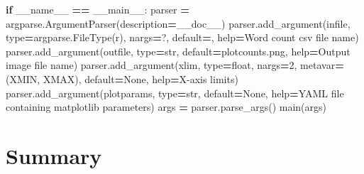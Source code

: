 \documentclass[
]{krantz}
\makeatletter
\newenvironment{Shaded}{\begin{snugshade}}{\end{snugshade}}
\newcommand{\BuiltInTok}[1]{#1}
\newcommand{\ControlFlowTok}[1]{\textcolor[rgb]{0.13,0.29,0.53}{\textbf{#1}}}
\newcommand{\DecValTok}[1]{\textcolor[rgb]{0.00,0.00,0.81}{#1}}
\newcommand{\NormalTok}[1]{#1}
\newcommand{\OperatorTok}[1]{\textcolor[rgb]{0.81,0.36,0.00}{\textbf{#1}}}
\newcommand{\StringTok}[1]{\textcolor[rgb]{0.31,0.60,0.02}{#1}}
\newcommand{\VariableTok}[1]{\textcolor[rgb]{0.00,0.00,0.00}{#1}}
\newenvironment{kframe}{%
\medskip{}
\setlength{\fboxsep}{.8em}
 \def\at@end@of@kframe{}%
 \ifinner\ifhmode%
  \def\at@end@of@kframe{\end{minipage}}%
  \begin{minipage}{\columnwidth}%
 \fi\fi%
 \def\FrameCommand##1{\hskip\@totalleftmargin \hskip-\fboxsep
 \colorbox{shadecolor}{##1}\hskip-\fboxsep
     \hskip-\linewidth \hskip-\@totalleftmargin \hskip\columnwidth}%
 \MakeFramed {\advance\hsize-\width
   \@totalleftmargin\z@ \linewidth\hsize
   \@setminipage}}%
 {\par\unskip\endMakeFramed%
 \at@end@of@kframe}
\renewenvironment{Shaded}{\begin{kframe}}{\end{kframe}}
\makeatother
\begin{document}
\begin{Shaded}
\begin{Highlighting}[]
\ControlFlowTok{if} \VariableTok{\_\_name\_\_} \OperatorTok{==} \StringTok{\textquotesingle{}\_\_main\_\_\textquotesingle{}}\NormalTok{:}
\NormalTok{    parser }\OperatorTok{=}\NormalTok{ argparse.ArgumentParser(description}\OperatorTok{=}\NormalTok{\_\_doc\_\_)}
\NormalTok{    parser.add\_argument(}\StringTok{\textquotesingle{}infile\textquotesingle{}}\NormalTok{, }\BuiltInTok{type}\OperatorTok{=}\NormalTok{argparse.FileType(}\StringTok{\textquotesingle{}r\textquotesingle{}}\NormalTok{), nargs}\OperatorTok{=}\StringTok{\textquotesingle{}?\textquotesingle{}}\NormalTok{,}
\NormalTok{                        default}\OperatorTok{=}\StringTok{\textquotesingle{}{-}\textquotesingle{}}\NormalTok{, }\BuiltInTok{help}\OperatorTok{=}\StringTok{\textquotesingle{}Word count csv file name\textquotesingle{}}\NormalTok{)}
\NormalTok{    parser.add\_argument(}\StringTok{\textquotesingle{}{-}{-}outfile\textquotesingle{}}\NormalTok{, }\BuiltInTok{type}\OperatorTok{=}\BuiltInTok{str}\NormalTok{, default}\OperatorTok{=}\StringTok{\textquotesingle{}plotcounts.png\textquotesingle{}}\NormalTok{,}
                        \BuiltInTok{help}\OperatorTok{=}\StringTok{\textquotesingle{}Output image file name\textquotesingle{}}\NormalTok{)}
\NormalTok{    parser.add\_argument(}\StringTok{\textquotesingle{}{-}{-}xlim\textquotesingle{}}\NormalTok{, }\BuiltInTok{type}\OperatorTok{=}\BuiltInTok{float}\NormalTok{, nargs}\OperatorTok{=}\DecValTok{2}\NormalTok{, metavar}\OperatorTok{=}\NormalTok{(}\StringTok{\textquotesingle{}XMIN\textquotesingle{}}\NormalTok{, }\StringTok{\textquotesingle{}XMAX\textquotesingle{}}\NormalTok{),}
\NormalTok{                        default}\OperatorTok{=}\VariableTok{None}\NormalTok{, }\BuiltInTok{help}\OperatorTok{=}\StringTok{\textquotesingle{}X{-}axis limits\textquotesingle{}}\NormalTok{)}
\NormalTok{    parser.add\_argument(}\StringTok{\textquotesingle{}{-}{-}plotparams\textquotesingle{}}\NormalTok{, }\BuiltInTok{type}\OperatorTok{=}\BuiltInTok{str}\NormalTok{, default}\OperatorTok{=}\VariableTok{None}\NormalTok{,}
                        \BuiltInTok{help}\OperatorTok{=}\StringTok{\textquotesingle{}YAML file containing matplotlib parameters\textquotesingle{}}\NormalTok{)}
\NormalTok{    args }\OperatorTok{=}\NormalTok{ parser.parse\_args()}
\NormalTok{    main(args)}
\end{Highlighting}
\end{Shaded}

\hypertarget{config-summary}{%
\section{Summary}\label{config-summary}}
\end{document}
